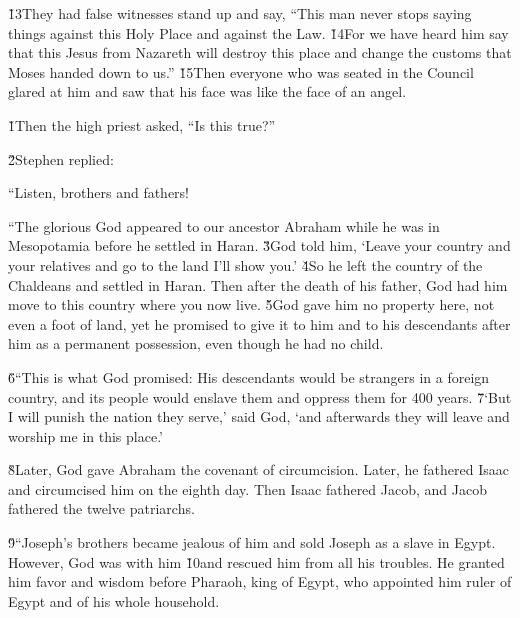 \v{13}They had false witnesses stand up and say, ``This man never stops saying things against this Holy Place and against the Law. \v{14}For we have heard him say that this Jesus from Nazareth will destroy this place and change the customs that Moses handed down to us.'' \v{15}Then everyone who was seated in the Council glared at him and saw that his face was like the face of an angel.

\v{1}Then the high priest asked, ``Is this true?''

\v{2}Stephen replied:

``Listen, brothers and fathers!

``The glorious God appeared to our ancestor Abraham while he was in Mesopotamia before he settled in Haran. \v{3}God told him, `Leave your country and your relatives and go to the land I'll show you.' \v{4}So he left the country of the Chaldeans and settled in Haran. Then after the death of his father, God had him move to this country where you now live. \v{5}God gave him no property here, not even a foot of land, yet he promised to give it to him and to his descendants after him as a permanent possession, even though he had no child.

\v{6}``This is what God promised: His descendants would be strangers in a foreign country, and its people would enslave them and oppress them for 400 years. \v{7}`But I will punish the nation they serve,' said God, `and afterwards they will leave and worship me in this place.'

\v{8}Later, God gave Abraham the covenant of circumcision. Later, he fathered Isaac and circumcised him on the eighth day. Then Isaac fathered Jacob, and Jacob fathered the twelve patriarchs.

\v{9}``Joseph's brothers became jealous of him and sold Joseph as a slave in Egypt. However, God was with him \v{10}and rescued him from all his troubles. He granted him favor and wisdom before Pharaoh, king of Egypt, who appointed him ruler of Egypt and of his whole household.

